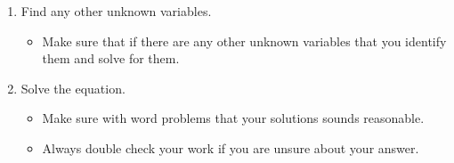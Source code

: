 \documentclass[12pt]{article}
\begin{document}
\begin{enumerate}
      \item Find any other unknown variables.
      \begin{itemize}
        \item Make sure that if there are any other unknown variables that you identify them and solve for them.
      \end{itemize}
  \newpage
      \item Solve the equation.
      \begin{itemize}
        \item Make sure with word problems that your solutions sounds reasonable.
        \item Always double check your work if you are unsure about your answer.
      \end{itemize}
    \end{enumerate}
\end{document}
